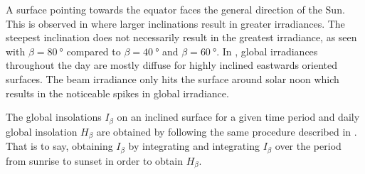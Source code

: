 A surface pointing towards the equator faces the general direction of the Sun. This is observed in  where larger inclinations result in greater irradiances. The steepest inclination does not necessarily result in the greatest irradiance, as seen with $\beta = \SI{80}{\degree}$ compared to $\beta = \SI{40}{\degree}$ and $\beta = \SI{60}{\degree}$. In , global irradiances throughout the day are mostly diffuse for highly inclined eastwards oriented surfaces. The beam irradiance only hits the surface around solar noon which results in the noticeable spikes in global irradiance.

The global insolations $I_{\beta}$ on an inclined surface for a given time period and daily global insolation $H_{\beta}$ are obtained by following the same procedure described in . That is to say, obtaining $I_{\beta}$ by integrating  and integrating $I_{\beta}$ over the period from sunrise to sunset in order to obtain $H_{\beta}$.



